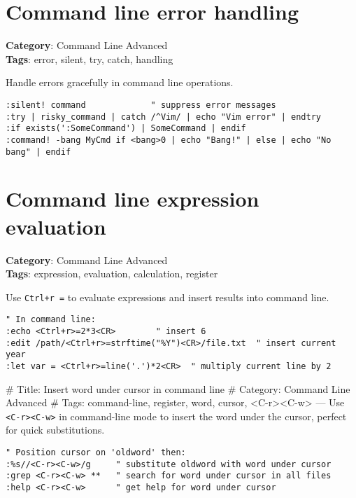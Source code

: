 {{{\section{Command line error handling}

\textbf{Category}: Command Line Advanced\\ \textbf{Tags}: error, silent, try, catch, handling
\vspace{0.5cm}

Handle errors gracefully in command line operations.

\begin{Exa*}{}
\begin{Verbatim}[fontsize=\footnotesize, breaklines, breakanywhere]
:silent! command             " suppress error messages
:try | risky_command | catch /^Vim/ | echo "Vim error" | endtry
:if exists(':SomeCommand') | SomeCommand | endif
:command! -bang MyCmd if <bang>0 | echo "Bang!" | else | echo "No bang" | endif
\end{Verbatim}
\end{Exa*}

\section{Command line expression evaluation}

\textbf{Category}: Command Line Advanced\\ \textbf{Tags}: expression, evaluation, calculation, register
\vspace{0.5cm}

Use {\footnotesize \Verb§Ctrl+r =§} to evaluate expressions and insert results into command line.

\begin{Exa*}{}
\begin{Verbatim}[fontsize=\footnotesize, breaklines, breakanywhere]
" In command line:
:echo <Ctrl+r>=2*3<CR>        " insert 6
:edit /path/<Ctrl+r>=strftime("%Y")<CR>/file.txt  " insert current year
:let var = <Ctrl+r>=line('.')*2<CR>  " multiply current line by 2
\end{Verbatim}
\end{Exa*}

\# Title: Insert word under cursor in command line
\# Category: Command Line Advanced
\# Tags: command-line, register, word, cursor, <C-r><C-w>
---
Use {\footnotesize \Verb§<C-r><C-w>§} in command-line mode to insert the word under the cursor, perfect for quick substitutions.

\begin{Exa*}{}
\begin{Verbatim}[fontsize=\footnotesize, breaklines, breakanywhere]
" Position cursor on 'oldword' then:
:%s//<C-r><C-w>/g     " substitute oldword with word under cursor
:grep <C-r><C-w> **   " search for word under cursor in all files
:help <C-r><C-w>      " get help for word under cursor
\end{Verbatim}
\end{Exa*}

}}}

